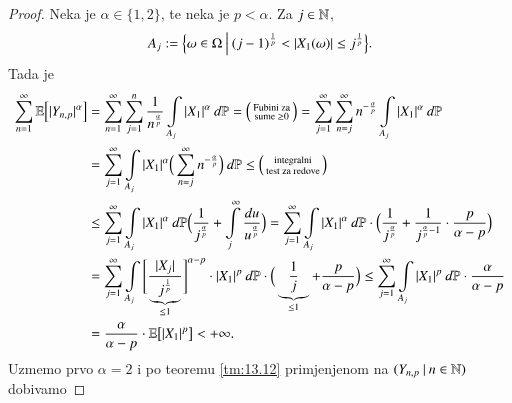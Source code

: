\begin{proof}
    Neka je $\alpha \in \{1, 2\}$, te neka je $p < \alpha$.
    Za $j \in \mathbb{N}$,
    \begin{equation*}
        A_j := \Big\{ {\omega \in \Omega} \: \Big| \: {(j - 1)^\frac{1}{p} < |X_1 (\omega)| \leq j^\frac{1}{p}} \Big\}.
    \end{equation*}
    Tada je
    \begin{equation*}
        \begin{aligned}
            \sum\limits_{n = 1}^{\infty} \mathbb{E} \Big[ |Y_{n, p}|^\alpha \Big] &= \sum\limits_{n = 1}^{\infty} \sum\limits_{j = 1}^{n} \frac{1}{n^\frac{\alpha}{p}} \int\limits_{A_j} |X_1|^\alpha \: d \mathbb{P} =
            \begin{psmallmatrix}
                \textnormal{Fubini za}\\
                \textnormal{sume } \geq 0
            \end{psmallmatrix}
            = \sum\limits_{j = 1}^{\infty} \sum\limits_{n = j}^{\infty} n^{- \frac{\alpha}{p}} \int\limits_{A_j} |X_1|^\alpha \: d \mathbb{P}\\
            &= \sum\limits_{j = 1}^{\infty} \int\limits_{A_j} |X_1|^\alpha \Big( \sum\limits_{n = j}^{\infty} n^{-\frac{\alpha}{p}} \Big) \: d \mathbb{P} \leq
            \begin{psmallmatrix}
                \textnormal{integralni}\\
                \textnormal{test za redove}
            \end{psmallmatrix}\\
            &\leq \sum\limits_{j = 1}^{\infty} \int\limits_{A_j} |X_1|^\alpha \: d \mathbb{P} \Big( \frac{1}{j^\frac{\alpha}{p}} + \int\limits_j^\infty \frac{du}{u^\frac{\alpha}{p}}\Big) = \sum\limits_{j = 1}^{\infty} \int\limits_{A_j} |X_1|^\alpha \: d \mathbb{P} \cdot \Big( \frac{1}{j^\frac{\alpha}{p}} + \frac{1}{j^{\frac{\alpha}{p} - 1}} \cdot \frac{p}{\alpha - p} \Big)\\
            &= \sum\limits_{j = 1}^{\infty} \int\limits_{A_j} \Bigg[ \frac{|X_j|}{ \underbrace{j^\frac{1}{p}}_{\leq 1}} \Bigg]^{\alpha - p} \cdot |X_1|^p \: d \mathbb{P} \cdot \Big( \underbrace{\frac{1}{j}}_{\leq 1} + \frac{p}{\alpha - p} \Big) \leq \sum\limits_{j = 1}^{\infty} \int\limits_{A_j} |X_1|^p \: d \mathbb{P} \cdot \frac{\alpha}{\alpha - p}\\
            &= \frac{\alpha}{\alpha - p} \cdot \mathbb{E} \big[ |X_1|^p \big] < +\infty.
        \end{aligned}
    \end{equation*}
    Uzmemo prvo $\alpha = 2$ i po teoremu \ref{tm:13.12} primjenjenom na $({Y_{n, p}} \: | \: {n \in \mathbb{N}})$ dobivamo

\end{proof}
